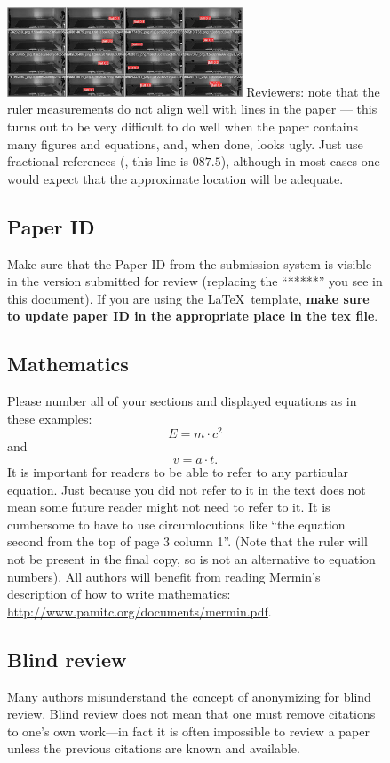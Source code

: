 \documentclass[10pt,twocolumn,letterpaper]{article}
\begin{document}
\begin{figure}{
  \includegraphics[width=7cm]{validation.jpeg}
}
Reviewers:
note that the ruler measurements do not align well with lines in the paper --- this turns out to be very difficult to do well when the paper contains many figures and equations, and, when done, looks ugly.
Just use fractional references (\eg, this line is $087.5$), although in most cases one would expect that the approximate location will be adequate.


\subsection{Paper ID}
Make sure that the Paper ID from the submission system is visible in the version submitted for review (replacing the ``*****'' you see in this document).
If you are using the \LaTeX\ template, \textbf{make sure to update paper ID in the appropriate place in the tex file}.


\subsection{Mathematics}

Please number all of your sections and displayed equations as in these examples:
\begin{equation}
  E = m\cdot c^2
  \label{eq:important}
\end{equation}
and
\begin{equation}
  v = a\cdot t.
  \label{eq:also-important}
\end{equation}
It is important for readers to be able to refer to any particular equation.
Just because you did not refer to it in the text does not mean some future reader might not need to refer to it.
It is cumbersome to have to use circumlocutions like ``the equation second from the top of page 3 column 1''.
(Note that the ruler will not be present in the final copy, so is not an alternative to equation numbers).
All authors will benefit from reading Mermin's description of how to write mathematics:
\url{http://www.pamitc.org/documents/mermin.pdf}.

\subsection{Blind review}

Many authors misunderstand the concept of anonymizing for blind review.
Blind review does not mean that one must remove citations to one's own work---in fact it is often impossible to review a paper unless the previous citations are known and available.


\end{figure}
\end{document}

